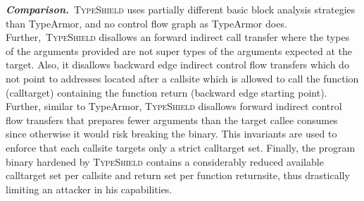 \textbf{\textit{Comparison.}}~\textsc{TypeShield} uses partially different basic block analysis strategies than TypeArmor,
and no control flow graph as TypeArmor does. Further,~\textsc{TypeShield}
disallows an forward indirect call transfer where the types of the arguments provided are not super 
types of the arguments expected at the target. Also, it disallows backward edge indirect control flow transfers which do not 
point to addresses located after a callsite which is allowed to call the function (calltarget) containing the function 
return (backward edge starting point).
Further, similar to TypeArmor, \textsc{TypeShield} disallows forward indirect control flow transfers that 
prepares fewer arguments than the target callee consumes since otherwise it would risk breaking the binary.
This invariants are used to enforce that each callsite targets only a strict calltarget set.
Finally, the program binary hardened by \textsc{TypeShield} contains a considerably reduced available calltarget set per callsite 
and return set per function returnsite, thus drastically limiting an attacker in his capabilities.

